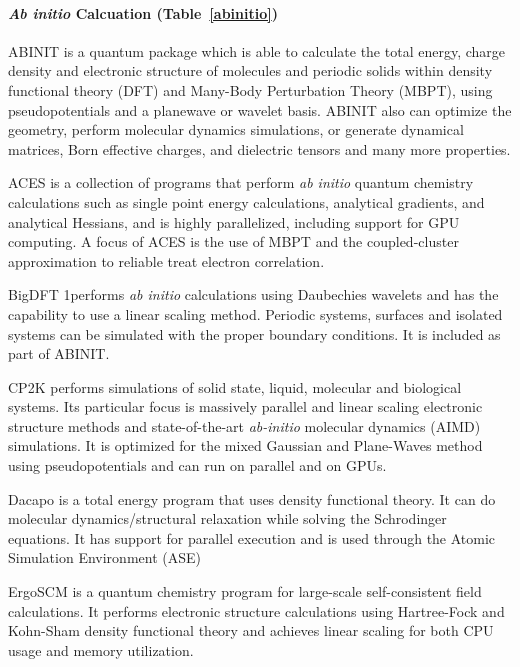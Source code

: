 \paragraph{\textit{Ab initio} Calcuation (Table~\ref{abinitio})}

ABINIT \cite{Gonze_2009} is a quantum package which is able to calculate the total energy, charge density and electronic structure of molecules and periodic solids within density functional theory (DFT) and Many-Body Perturbation Theory (MBPT), using pseudopotentials and a planewave or wavelet basis. ABINIT also can optimize the geometry, perform molecular dynamics simulations, or generate dynamical matrices, Born effective charges, and dielectric tensors and many more properties. 

ACES \cite{Lotrich_2008} is a collection of programs that perform \textit{ab initio} quantum chemistry calculations such as single point energy calculations, analytical gradients, and analytical Hessians, and is highly parallelized, including support for GPU computing.
A focus of ACES is the use of MBPT and the coupled-cluster approximation to reliable treat electron correlation.

BigDFT \cite{Genovese_2008,Mohr_2014,Mohr_2015} 1performs \textit{ab initio} calculations using Daubechies wavelets and has the capability to use a linear scaling method.  Periodic systems, surfaces and isolated systems can be simulated with the proper boundary conditions. It is included as part of ABINIT.

CP2K \cite{Hutter_2013} performs simulations of solid state, liquid, molecular and biological systems. Its particular focus is massively parallel and linear scaling electronic structure methods and state-of-the-art \textit{ab-initio} molecular dynamics (AIMD) simulations. It is optimized for the mixed Gaussian and Plane-Waves method using pseudopotentials and can run on parallel and on GPUs.

Dacapo is a total energy program that uses density functional theory. It can do molecular dynamics/structural relaxation while solving the Schrodinger equations. It has support for parallel execution and is used through the Atomic Simulation Environment (ASE) \cite{Bahn_2002}

ErgoSCM \cite{Rudberg_2011} is a quantum chemistry program for large-scale self-consistent field calculations. It performs electronic structure calculations using Hartree-Fock and Kohn-Sham density functional theory and achieves linear scaling for both CPU usage and memory utilization.

